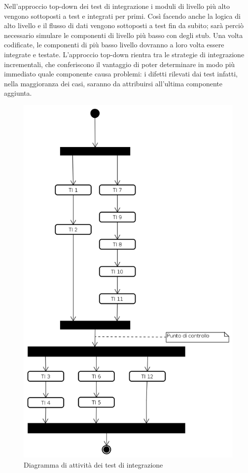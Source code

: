 Nell'approccio top-down dei test di integrazione i moduli di livello più alto vengono sottoposti a test e integrati per primi. Così facendo anche la logica di alto livello e il flusso di dati vengono sottoposti a test fin da subito; sarà perciò necessario simulare le componenti di livello più basso con degli stub. Una volta codificate, le componenti di più basso livello dovranno a loro volta essere integrate e testate. L'approccio top-down rientra tra le strategie di integrazione incrementali, che conferiscono il vantaggio di poter determinare in modo più immediato quale componente causa problemi: i difetti rilevati dai test infatti, nella maggioranza dei casi, saranno da attribuirsi all'ultima componente aggiunta.
\begin{figure}[ht]
	\centering
	\includegraphics[scale=0.50]{DiagrammaDiAttivita.png}
	\caption{Diagramma di attività dei test di integrazione}
\end{figure}
\FloatBarrier

